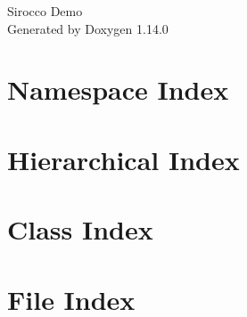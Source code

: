 \documentclass[twoside]{book}
\newcommand{\+}{\discretionary{\mbox{\scriptsize$\hookleftarrow$}}{}{}}
\newcommand{\clearemptydoublepage}{%
    \newpage{\pagestyle{empty}\cleardoublepage}%
  }
\begin{document}
  \raggedbottom
  \begin{titlepage}
  \vspace*{7cm}
  \begin{center}%
  {\Large Sirocco Demo}\\
  \vspace*{1cm}
  {\large Generated by Doxygen 1.14.0}\\
  \end{center}
  \end{titlepage}
  \clearemptydoublepage
  \tableofcontents
  \clearemptydoublepage





\chapter{Namespace Index}

\chapter{Hierarchical Index}

\chapter{Class Index}

\chapter{File Index}

\end{document}
